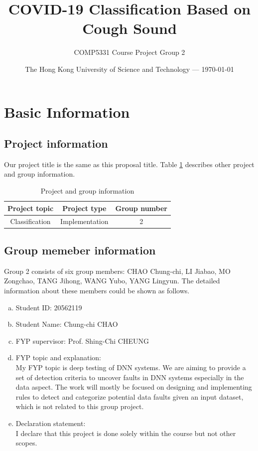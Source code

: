 \documentclass[11pt]{article}
\title{COVID-19 Classification Based on Cough Sound} %
\author{COMP5331 Course Project Group 2} %
\date{The Hong Kong University of Science and Technology --- \today} %
\begin{document}
\maketitle %


\section{Basic Information}
\subsection{Project information}
Our project title is the same as this proposal title. Table \ref{tab1} describes other project and
group information.
\begin{table}[!htbp]
	\caption{Project and group information} \centering
	\label{tab1}
	\begin{tabular}{ccc}
	\toprule[1.5pt]
	Project topic  & Project type & Group number \\
    \midrule[1pt]
    Classification & Implementation & 2 \\
	\bottomrule[1.5pt]
	\end{tabular}
\end{table}

\subsection{Group memeber information}
Group 2 consists of  six group members: CHAO Chung-chi, LI Jiabao, MO Zongchao, TANG Jihong,
WANG Yubo, YANG Lingyun. The detailed information about these members could be shown as
follows.

\begin{member}
	\begin{enumerate}[(a)]
		\item Student ID: 20562119
		\item Student Name: Chung-chi CHAO
		\item FYP supervisor: Prof. Shing-Chi CHEUNG
		\item FYP topic and explanation: \\
		My FYP topic is deep testing of DNN systems. We are aiming to provide a set of detection criteria to uncover faults in DNN systems especially in the data aspect. The work will mostly be focused on designing and implementing rules to detect and categorize potential data faults given an input dataset, which is not related to this group project.
		\item Declaration statement: \\
		I declare that this project is done solely within the course but not other scopes.
	\end{enumerate}
\end{member}
\end{document}

